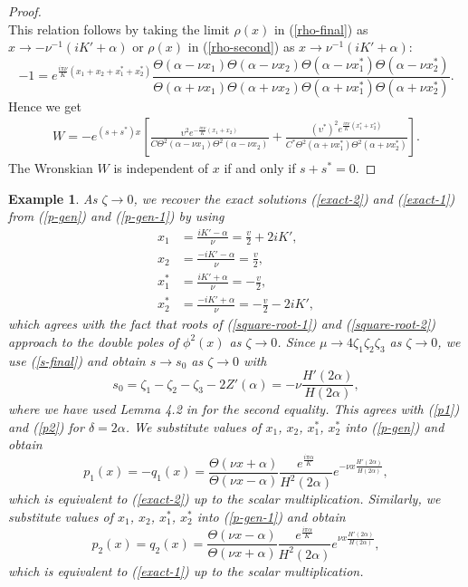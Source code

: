 \documentclass[12pt,reqno]{amsart}
\numberwithin{equation}{section}
\newtheorem{example}{Example}
\begin{document}
\begin{proof}
$$$$
This relation follows by taking the limit $\rho(x)$ in (\ref{rho-final}) as $x \to -\nu^{-1} (iK'+\alpha)$ or $\rho(x)$ in (\ref{rho-second}) as $x \to \nu^{-1} (iK'+\alpha)$:
\begin{equation*}
-1 = e^{\frac{i\pi \nu}{K} (x_1 + x_2 + x_1^* + x_2^*)} \frac{\Theta(\alpha - \nu x_1) \Theta(\alpha - \nu x_2) \Theta(\alpha - \nu x_1^*) \Theta(\alpha - \nu x_2^*)}{\Theta(\alpha + \nu x_1) \Theta(\alpha + \nu x_2) \Theta(\alpha + \nu x_1^*) \Theta(\alpha + \nu x_2^*)}.
\end{equation*}
Hence we get 
\begin{align*}
W = -e^{(s+s^*)x} \left[ \frac{\upsilon^2 e^{-\frac{i \pi \nu}{K} (x_1 + x_2)}}{C
	\Theta^2(\alpha - \nu x_1) \Theta^2(\alpha - \nu x_2)}  + \frac{(\upsilon^*)^2 e^{\frac{i \pi \nu }{K} (x_1^* + x_2^*)}}{C^*
	\Theta^2(\alpha + \nu x_1^*) \Theta^2(\alpha + \nu x_2^*)}  \right].
\end{align*}
The Wronskian $W$ is independent of $x$ if and only if $s + s^* = 0$.
\end{proof}


\begin{example}
As $\zeta \to 0$, we recover the exact solutions (\ref{exact-2}) and (\ref{exact-1}) from (\ref{p-gen}) and (\ref{p-gen-1}) by using 
\begin{align*}
x_1 &= \frac{iK' - \alpha}{\nu} = \frac{v}{2} + 2 i K' , \\
x_2 &= \frac{-iK' - \alpha}{\nu} = \frac{v}{2} , \\
x_1^*  &= \frac{iK' + \alpha}{\nu} = -\frac{v}{2}, \\
x_2^* &= \frac{-iK' + \alpha}{\nu} = -\frac{v}{2} - 2 i K' , 
\end{align*}
which agrees with the fact that roots of (\ref{square-root-1}) and (\ref{square-root-2}) approach to the double poles of $\phi^2(x)$ as $\zeta \to 0$. Since  $\mu \to 4 \zeta_1 \zeta_2 \zeta_3$ as $\zeta \to 0$, 
we use (\ref{s-final}) and obtain $s \to s_0$ as $\zeta \to 0$ with 
$$
s_0 = \zeta_1 - \zeta_2 - \zeta_3 - 2 Z'(\alpha) = -\nu \frac{H'(2\alpha)}{H(2 \alpha)},
$$
where we have used Lemma 4.2 in \cite{AP25} for the second equality. 
This agrees with (\ref{p1}) and (\ref{p2}) for $\delta = 2 \alpha$. 
We substitute values of $x_1$, $x_2$, $x_1^*$, $x_2^*$ into (\ref{p-gen}) and obtain 
$$
p_1(x) = -q_1(x) = \frac{\Theta(\nu x + \alpha)}{\Theta(\nu x - \alpha)} 
\frac{e^{\frac{i \pi \alpha}{K}}}{H^2(2 \alpha)} e^{-\nu x  \frac{H'(2\alpha)}{H(2\alpha)}},
$$
which is equivalent to (\ref{exact-2}) up to the scalar multiplication. Similarly, we substitute values of $x_1$, $x_2$, $x_1^*$, $x_2^*$ into (\ref{p-gen-1}) and obtain 
$$
p_2(x) = q_2(x) = \frac{\Theta(\nu x - \alpha)}{\Theta(\nu x + \alpha)} 
\frac{e^{\frac{i \pi \alpha}{K}}}{H^2(2 \alpha)} e^{\nu x  \frac{H'(2\alpha)}{H(2\alpha)}},
$$
which is equivalent to (\ref{exact-1}) up to the scalar multiplication.
\end{example} 
\end{document}
